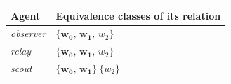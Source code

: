 \begin{tabular}{@{}ll@{}}
\toprule
\textbf{Agent} & \textbf{Equivalence classes of its relation} \\
\midrule
\textit{observer} & $\{\mathbf{w_{0}},\,\mathbf{w_{1}},\,w_{2}\}$ \\
\textit{relay} & $\{\mathbf{w_{0}},\,\mathbf{w_{1}},\,w_{2}\}$ \\
\textit{scout} & $\{\mathbf{w_{0}},\,\mathbf{w_{1}}\}\ \{w_{2}\}$ \\
\bottomrule
\end{tabular}
